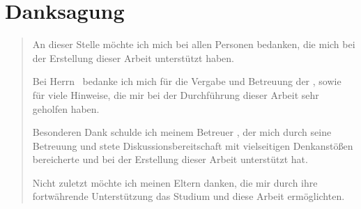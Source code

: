 
\chapter*{Danksagung}
\thispagestyle{empty}

\begin{quote}
An dieser Stelle möchte ich mich bei allen Personen bedanken, die mich bei der Erstellung dieser Arbeit unterstützt haben. 

Bei Herrn \erstgutachter\ bedanke ich mich für die Vergabe und Betreuung der \arbeitsart, sowie für viele Hinweise, die mir bei der Durchführung dieser Arbeit sehr geholfen haben.

Besonderen Dank schulde ich meinem Betreuer \zweitgutachter, der mich durch seine Betreuung und stete Diskussionsbereitschaft mit vielseitigen Denkanstößen bereicherte und bei der Erstellung dieser Arbeit unterstützt hat.

Nicht zuletzt möchte ich meinen Eltern danken, die mir durch ihre fortwährende Unterstützung das Studium und diese Arbeit ermöglichten.
\end{quote}
